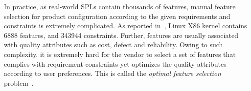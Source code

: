 In practice, as real-world SPLs contain thousands of features, manual feature selection for product configuration according to the given requirements and constraints is extremely complicated. As reported in~\cite{DBLP:conf/icse/SheLBWC11}, Linux X86 kernel contains 6888 features, and 343944 constraints. Further, features are usually associated with quality attributes such as cost, defect and reliability. Owing to such complexity, it is extremely hard for the vendor to select a set of features that complies with requirement constraints yet optimizes the quality attributes according to user preferences. This is called the \emph{optimal feature selection} problem~\cite{DBLP:journals/jss/GuoWWLW11}. %


